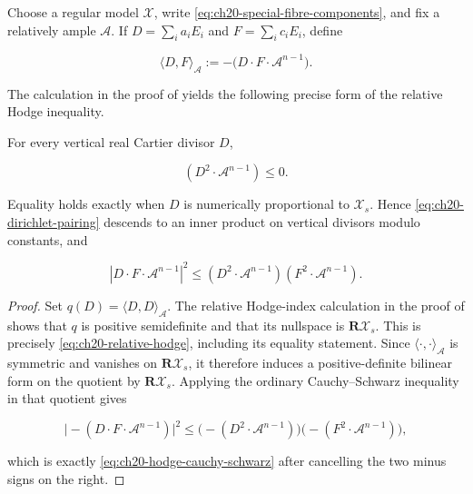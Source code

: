 Choose a regular model \(\mathcal X\), write
\eqref{eq:ch20-special-fibre-components}, and fix a relatively ample
\(\mathcal A\).  If \(D=\sum_i a_iE_i\) and
\(F=\sum_i c_iE_i\), define

\begin{equation}
\label{eq:ch20-dirichlet-pairing}
             \langle D,F\rangle_{\mathcal A}
             :=-\bigl(D\cdot F\cdot\mathcal A^{n-1}\bigr).
\end{equation}

The calculation in the proof of  yields the
following precise form of the relative Hodge inequality.

\begin{proposition}\label{prop:ch20-relative-hodge}
For every vertical real Cartier divisor \(D\),

\begin{equation}
\label{eq:ch20-relative-hodge}
                    (D^2\cdot\mathcal A^{n-1})\leq0.
\end{equation}

Equality holds exactly when \(D\) is numerically proportional to
\(\mathcal X_s\).  Hence \eqref{eq:ch20-dirichlet-pairing} descends to an
inner product on vertical divisors modulo constants, and

\begin{equation}
\label{eq:ch20-hodge-cauchy-schwarz}
 |D\cdot F\cdot\mathcal A^{n-1}|^2
 \leq
 (D^2\cdot\mathcal A^{n-1})
 (F^2\cdot\mathcal A^{n-1}).
\end{equation}
\end{proposition}

\begin{proof}
Set \(q(D)=\langle D,D\rangle_{\mathcal A}\).  The relative Hodge-index
calculation in the proof of  shows that \(q\) is
positive semidefinite and that its nullspace is
\(\mathbf R\mathcal X_s\).  This is precisely
\eqref{eq:ch20-relative-hodge}, including its equality statement.  Since
\(\langle\cdot,\cdot\rangle_{\mathcal A}\) is symmetric and vanishes on
\(\mathbf R\mathcal X_s\), it therefore induces a positive-definite
bilinear form on the quotient by \(\mathbf R\mathcal X_s\).  Applying the
ordinary Cauchy--Schwarz inequality in that quotient gives

\[
 \bigl|-(D\cdot F\cdot\mathcal A^{n-1})\bigr|^2
 \leq
 \bigl(-(D^2\cdot\mathcal A^{n-1})\bigr)
 \bigl(-(F^2\cdot\mathcal A^{n-1})\bigr),
\]

which is exactly \eqref{eq:ch20-hodge-cauchy-schwarz} after cancelling the
two minus signs on the right.
\end{proof}

